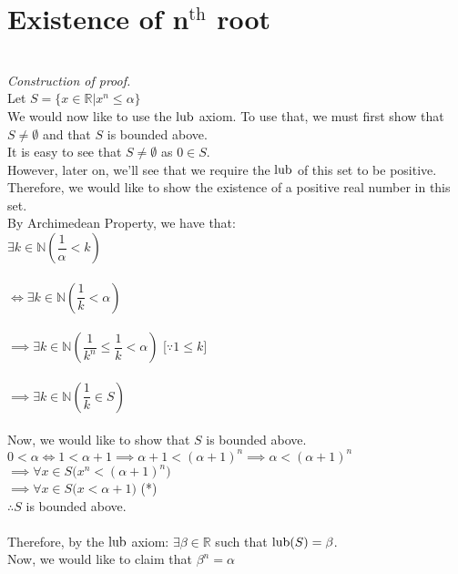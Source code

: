 \section{Existence of n$^\text{th}$ root}\label{sec:rootn}
\\
\textit{Construction of proof.}\\
Let $S = \{x \in \mathbb{R}|x^n \le \alpha\}$\\
We would now like to use the $\operatorname{lub}$ axiom. To use that, we must first show that $S \neq \emptyset$ and that  $S$ is bounded above.\\
It is easy to see that $S \neq \emptyset$ as $0 \in S$.\\
However, later on, we'll see that we require the $\operatorname{lub}$ of this set to be positive. Therefore, we would like to show the existence of a positive real number in this set.\\
By Archimedean Property, we have that:\\
$\exists k \in \mathbb{N}\left(\dfrac{1}{\alpha} < k\right)$\\~\\
$\iff\exists k \in \mathbb{N}\left(\dfrac{1}{k} < \alpha\right)$\\~\\
$\implies\exists k \in \mathbb{N}\left(\dfrac{1}{k^n} \le \dfrac{1}{k} < \alpha\right)$ \hfill [$\because 1 \le k]$\\~\\
$\implies \exists k \in \mathbb{N}\left(\dfrac{1}{k} \in S\right)$\\~\\
Now, we would like to show that $S$ is bounded above.\\
$0 < \alpha \iff 1 < \alpha + 1 \implies \alpha + 1 < (\alpha + 1)^n \implies \alpha < (\alpha + 1)^n$\\
$\implies \forall x \in S\big(x^n < (\alpha + 1)^n\big)$\\
$\implies \forall x \in S\big(x < \alpha + 1\big)$ \hfill (*)\\
$\therefore S$ is bounded above.\\~\\
Therefore, by the $\operatorname{lub}$ axiom: $\exists \beta \in \mathbb{R}$ such that $\operatorname{lub}(S) = \beta$.\\
Now, we would like to claim that $\beta^n = \alpha$\\
